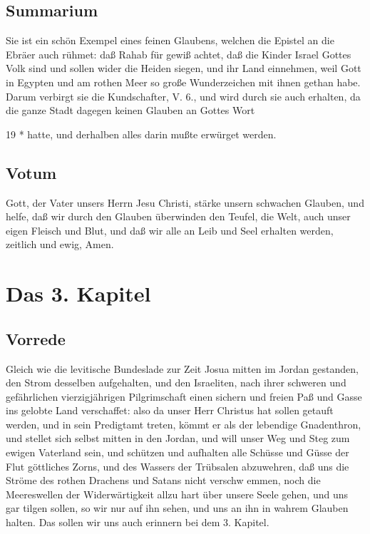 \section{Summarium}

Sie ist ein schön Exempel eines feinen Glaubens, welchen die Epistel an die Ebräer auch rühmet: daß Rahab für gewiß achtet, daß die Kinder Israel Gottes Volk sind und sollen wider die Heiden siegen, und ihr Land einnehmen, weil Gott in Egypten und am rothen Meer so große Wunderzeichen mit ihnen gethan habe. Darum verbirgt sie die Kundschafter, V. 6., und wird durch sie auch erhalten, da die ganze Stadt dagegen keinen Glauben an Gottes Wort

19 *
hatte, und derhalben alles darin mußte erwürget werden.

\section{Votum}

Gott, der Vater unsers Herrn Jesu Christi, stärke unsern schwachen Glauben, und helfe, daß wir durch den Glauben überwinden den Teufel, die Welt, auch unser eigen Fleisch und Blut, und daß wir alle an Leib und Seel erhalten werden, zeitlich und ewig, Amen.

\chapter{Das 3. Kapitel}

\section{Vorrede}

Gleich wie die levitische Bundeslade zur Zeit Josua mitten im Jordan gestanden, den Strom desselben aufgehalten, und den Israeliten, nach ihrer schweren und gefährlichen vierzigjährigen Pilgrimschaft einen sichern und freien Paß und Gasse ins gelobte Land verschaffet: also da unser Herr Christus hat sollen getauft werden, und in sein Predigtamt treten, kömmt er als der lebendige Gnadenthron, und stellet sich selbst mitten in den Jordan, und will unser Weg und Steg zum ewigen Vaterland sein, und schützen und aufhalten alle Schüsse und Güsse der Flut göttliches Zorns, und des Wassers der Trübsalen abzuwehren, daß uns die Ströme des rothen Drachens und Satans nicht verschw emmen, noch die Meereswellen der Widerwärtigkeit allzu hart über unsere Seele gehen, und uns gar tilgen sollen, so wir nur auf ihn sehen, und uns an ihn in wahrem Glauben halten. Das sollen wir uns auch erinnern bei dem 3. Kapitel.

